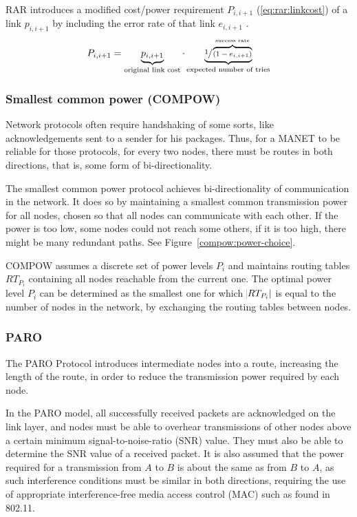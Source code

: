 RAR\cite{banerjee2002minimum} introduces a modified cost/power requirement
$P_{i,i+1}$ (\ref{eq:rar:linkcost}) of a link $p_{i,i+1}$ by including the error
rate of that link $e_{i,i+1}$ .
\begin{align}\label{eq:rar:linkcost}
  P_{i,i+1} = \underbrace{p_{i,i+1}}_{\text{original link cost}} \cdot \underbrace{\sfrac{1}{\overbrace{(1-e_{i,i+1})}^{\text{success rate}}}}_{\text{expected number of tries}}
\end{align} 

\subsubsection{Smallest common power (COMPOW)}
Network protocols often require handshaking of some sorts, like acknowledgements
sent to a sender for his packages. Thus, for a MANET to be reliable for those
protocols, for every two nodes, there must be routes in both directions, that
is, some form of bi-directionality.

The smallest common power protocol\cite{narayanaswamy2002power} achieves bi-directionality
of communication in the network.
It does so by maintaining a smallest common transmission power for all nodes,
chosen so that all nodes can communicate with each other. If the power is too
low, some nodes could not reach some others, if it is too high, there might be
many redundant paths. See Figure~\ref{compow:power-choice}.

COMPOW assumes a discrete set of power levels $P_{i}$ and maintains routing
tables ${RT}_{P_{i}}$ containing all nodes reachable from the current one. The
optimal power level $P_{i}$ can be determined as the smallest one for which
$\abs{RT_{P_{i}}}$ is equal to the number of nodes in the network, by
exchanging the routing tables between nodes.


\subsubsection{PARO}
The PARO Protocol\cite{gomez2003paro} introduces intermediate nodes into a
route, increasing the length of the route, in order to reduce the transmission
power required by each node.

In the PARO model, all successfully received packets are acknowledged on the
link layer, and nodes must be able to overhear transmissions of other nodes
above a certain minimum signal-to-noise-ratio (SNR) value. They must also
be able to determine the SNR value of a received packet. It is also assumed
that the power required for a transmission from $A$ to $B$ is about the same
as from $B$ to $A$, as such interference conditions must be similar in both
directions, requiring the use of appropriate interference-free media access
control (MAC) such as found in 802.11.

